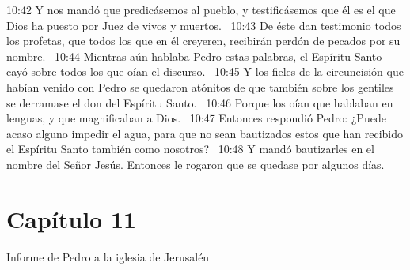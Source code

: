 10:42 Y nos mandó que predicásemos al pueblo, y testificásemos que él es el que Dios ha puesto por Juez de vivos y muertos.  
10:43 De éste dan testimonio todos los profetas, que todos los que en él creyeren, recibirán perdón de pecados por su nombre.  
10:44 Mientras aún hablaba Pedro estas palabras, el Espíritu Santo cayó sobre todos los que oían el discurso.  
10:45 Y los fieles de la circuncisión que habían venido con Pedro se quedaron atónitos de que también sobre los gentiles se derramase el don del Espíritu Santo.  
10:46 Porque los oían que hablaban en lenguas, y que magnificaban a Dios.  
10:47 Entonces respondió Pedro: ¿Puede acaso alguno impedir el agua, para que no sean bautizados estos que han recibido el Espíritu Santo también como nosotros?  
10:48 Y mandó bautizarles en el nombre del Señor Jesús. Entonces le rogaron que se quedase por algunos días.  
\section*{Capítulo 11}
Informe de Pedro a la iglesia de Jerusalén  

